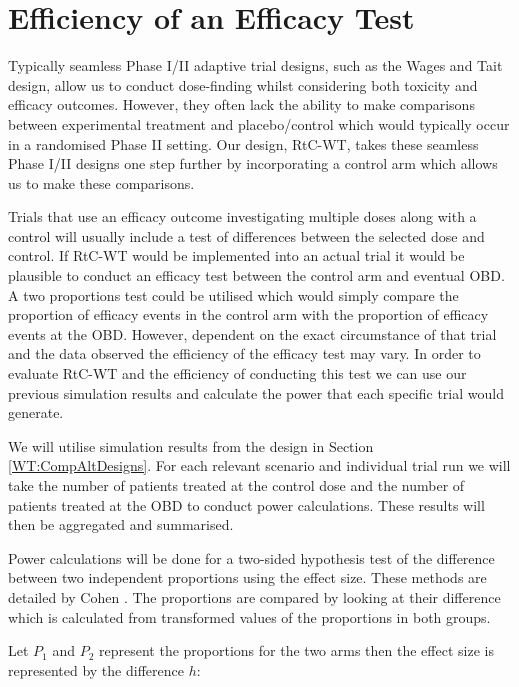 \section{Efficiency of an Efficacy Test}
\label{WT:Efficiency-Efficacy-Test}

Typically seamless Phase \RN{1}/\RN{2} adaptive trial designs, such as the Wages and Tait design, allow us to conduct dose-finding whilst considering both toxicity and efficacy outcomes. However, they often lack the ability to make comparisons between experimental treatment and placebo/control which would typically occur in a randomised Phase \RN{2} setting. Our design, RtC-WT, takes these seamless Phase \RN{1}/\RN{2} designs one step further by incorporating a control arm which allows us to make these comparisons. 

Trials that use an efficacy outcome investigating multiple doses along with a control will usually include a test of differences between the selected dose and control. If RtC-WT would be implemented into an actual trial it would be plausible to conduct an efficacy test between the control arm and eventual OBD. A two proportions test could be utilised which would simply compare the proportion of efficacy events in the control arm with the proportion of efficacy events at the OBD. However, dependent on the exact circumstance of that trial and the data observed the efficiency of the efficacy test may vary. In order to evaluate RtC-WT and the efficiency of conducting this test we can use our previous simulation results and calculate the power that each specific trial would generate.  

We will utilise simulation results from the design in Section \ref{WT:CompAltDesigns}. For each relevant scenario and individual trial run we will take the number of patients treated at the control dose and the number of patients treated at the OBD to conduct power calculations. These results will then be aggregated and summarised.  

Power calculations will be done for a two-sided hypothesis test of the difference between two independent proportions using the effect size. These methods are detailed by Cohen \cite{cohenStatisticalPowerAnalysis1988}. The proportions are compared by looking at their difference which is calculated from transformed values of the proportions in both groups.

Let $P_{1}$ and $P_{2}$ represent the proportions for the two arms then the effect size is represented by the difference $h$: 

